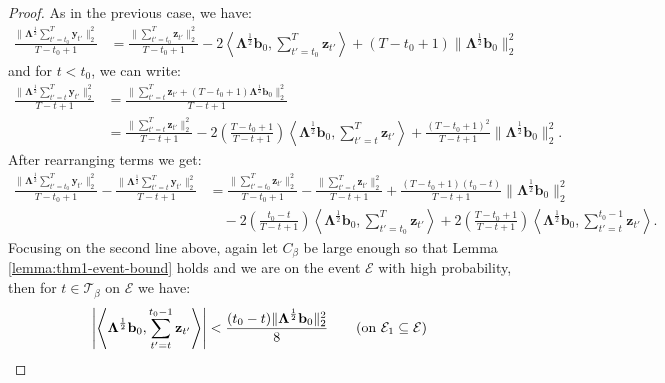 \begin{proof}
As in the previous case, we have:
\begin{align*}
    \frac{\lVert\boldsymbol{\Lambda}^{\frac{1}{2}} \sum_{t'=t_0}^T\mathbf{y}_{t'}\rVert_2^2}{T-t_0+1} &= \frac{\lVert\sum_{t'=t_0}^T\mathbf{z}_{t'}\rVert_2^2}{T-t_0+1} - 2\left\langle \boldsymbol{\Lambda}^{\frac{1}{2}}\mathbf{b}_0, \sum_{t'=t_0}^T\mathbf{z}_{t'}\right\rangle + (T-t_0+1)\lVert\boldsymbol{\Lambda}^{\frac{1}{2}}\mathbf{b}_0\rVert_2^2
\end{align*}
and for $t < t_0$, we can write:
\begin{align*}
    \frac{\lVert\boldsymbol{\Lambda}^{\frac{1}{2}} \sum_{t'=t}^T\mathbf{y}_{t'}\rVert_2^2}{T-t+1} &= \frac{\lVert \sum_{t'=t}^T\mathbf{z}_{t'} + (T-t_0+1)\boldsymbol{\Lambda}^{\frac{1}{2}}\mathbf{b}_0\rVert_2^2}{T-t+1} \\
    &= \frac{\lVert \sum_{t'=t}^T\mathbf{z}_{t'}\rVert_2^2}{T-t+1} -2\left(\frac{T-t_0+1}{T-t+1}\right) \left\langle \boldsymbol{\Lambda}^{\frac{1}{2}}\mathbf{b}_0, \sum_{t'=t}^T\mathbf{z}_{t'}\right\rangle  + \frac{(T-t_0+1)^2}{T-t+1}\lVert\boldsymbol{\Lambda}^{\frac{1}{2}}\mathbf{b}_0\rVert_2^2.
\end{align*}
After rearranging terms we get:
\begin{align*}
    \frac{\lVert\boldsymbol{\Lambda}^{\frac{1}{2}} \sum_{t'=t_0}^T\mathbf{y}_{t'}\rVert_2^2}{T-t_0+1} - \frac{\lVert\boldsymbol{\Lambda}^{\frac{1}{2}} \sum_{t'=t}^T\mathbf{y}_{t'}\rVert_2^2}{T-t+1} &=\frac{\lVert \sum_{t'=t_0}^T\mathbf{z}_{t'}\rVert_2^2}{T-t_0+1} - \frac{\lVert\sum_{t'=t}^T\mathbf{z}_{t'}\rVert_2^2}{T-t+1} + \frac{(T-t_0+1)(t_0 - t) }{T-t+1}\lVert\boldsymbol{\Lambda}^{\frac{1}{2}} \mathbf{b}_0\rVert^2_2 \\
    &\quad - 2\left(\frac{t_0 - t}{T-t+1}\right)\left\langle \boldsymbol{\Lambda}^{\frac{1}{2}}\mathbf{b}_0, \sum_{t'=t_0}^T\mathbf{z}_{t'}\right\rangle + 2\left(\frac{T-t_0+1}{T-t+1}\right)\left\langle \boldsymbol{\Lambda}^{\frac{1}{2}}\mathbf{b}_0, \sum_{t'=t}^{t_0-1}\mathbf{z}_{t'}\right\rangle.
\end{align*}
Focusing on the second line above, again let $C_\beta$ be large enough so that Lemma \ref{lemma:thm1-event-bound} holds and we are on the event $\mathcal{E}$ with high probability, then for $t \in \mathcal{T}_\beta$ on $\mathcal{E}$ we have:
\begin{align*}
    \left|\left\langle\boldsymbol{\Lambda}^{\frac{1}{2}}\mathbf{b}_0, \sum_{t'=t}^{t_0-1}\mathbf{z}_{t'} \right\rangle\right| < \frac{(t_0-t) \lVert\boldsymbol{\Lambda}^{\frac{1}{2}} \mathbf{b}_0\rVert_2^2}{8} \tag{on $\mathcal{E}_1 \subseteq \mathcal{E}$}

\end{align*}
\end{proof}
